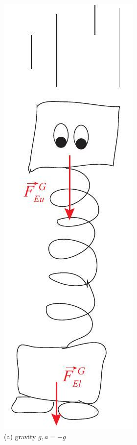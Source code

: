 \documentclass[10pt]{article}
\begin{document}
\includegraphics[max width=\textwidth, center]{2024_09_14_9969b06773f10b6936e8g-256}\\
(a) gravity $g, a=-g$
\end{document}
